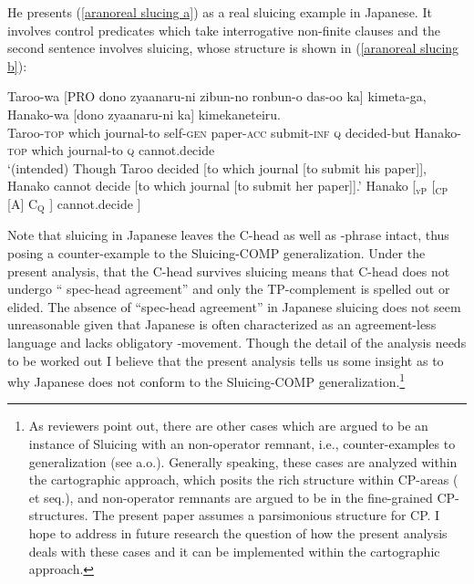 \documentclass[output=paper]{langscibook}
\begin{document}
He presents (\ref{aranoreal slucing a}) as a real sluicing example in Japanese. It involves control predicates which take interrogative non-finite clauses and the second sentence involves sluicing, whose structure is shown in (\ref{aranoreal slucing b}):

\newpage

\ea 
\ea \label{aranoreal slucing a}
\gll Taroo-wa \textup{[}PRO dono zyaanaru-ni zibun-no ronbun-o das-oo ka\textup{]} kimeta-ga, Hanako-wa \textup{[}dono zyaanaru-ni ka\textup{]} kimekaneteiru.    \\
Taroo-\textsc{top} {} which journal-to self-\textsc{gen} paper-\textsc{acc} submit-\textsc{inf} \textsc{q} decided-but Hanako-\textsc{top} \phantom{[}which journal-to \textsc{q} cannot.decide  \\
\glt `(intended) Though Taroo decided [to which journal [to submit his paper]], Hanako cannot decide [to which journal [to submit her paper]].'
\ex \upshape Hanako [$_{\mathrm{vP}}$ [$_{\mathrm{CP}}$ [A]  C$_{\mathrm{Q}}$  ] cannot.decide ] \label{aranoreal slucing b}
\z
\z 
{} 

\noindent Note that sluicing in Japanese leaves the C-head as well as \wh-phrase intact, thus posing a counter-example to the Sluicing-COMP generalization. Under the present analysis, that the C-head survives sluicing means that C-head does not undergo `` spec-head agreement'' and only the TP-complement is spelled out or elided. The absence of ``spec-head agreement'' in Japanese sluicing does not seem unreasonable given that Japanese is often characterized as an agreement-less language and lacks obligatory \wh-movement. Though the detail of the analysis needs to be worked out I believe that the present analysis tells us some insight as to why Japanese does not conform to the Sluicing-COMP generalization.\footnote{As reviewers point out, there are other cases which are argued to be an instance of Sluicing with an non-operator remnant, i.e., counter-examples to  generalization (see \citet{Craenenbroeck2010The-syntax-of-e, Craenenbroeck2013What-sluicing-c, Marusic2015On-a-potential-, Marusic2018Surviving-sluic} a.o.). Generally speaking, these cases are analyzed within the cartographic approach, which posits the rich structure within CP-areas (\citet{Rizzi1997The-fine-struct} et seq.), and non-operator remnants are argued to be in the fine-grained CP-structures. The present paper assumes a parsimonious structure for CP\@. I hope to address in future research the question of how the present analysis deals with these cases and it can be implemented within the cartographic approach.}
\end{document}
